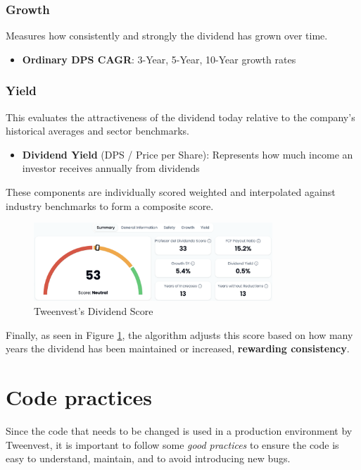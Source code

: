 \documentclass[11pt,english,a4paper,hidelinks]{book}
\begin{document}
\subsubsection{Growth}
\noindent Measures how consistently and strongly the dividend has grown over time.
\begin{itemize}
    \item \textbf{Ordinary DPS CAGR}: 3-Year, 5-Year, 10-Year growth rates
\end{itemize}

\subsubsection{Yield}
\noindent This evaluates the attractiveness of the dividend today relative to the company's historical averages and sector benchmarks.
\begin{itemize}
    \item \textbf{Dividend Yield} (DPS / Price per Share): Represents how much income an investor receives annually from dividends
\end{itemize}

\vspace{0.5cm}
\noindent These components are individually scored weighted and interpolated against industry benchmarks to form a composite score. 

\begin{figure}[H]
    \centering
    \includegraphics[width=0.8\textwidth]{images/tweenvest/dividend score.png}
    \caption{Tweenvest's Dividend Score}
    \label{fig:dividend_score}
\end{figure}

\noindent Finally, as seen in Figure \ref{fig:dividend_score}, the algorithm adjusts this score based on how many years the dividend has been maintained or increased, \textbf{rewarding consistency}.

\section{Code practices}
Since the code that needs to be changed is used in a production environment by Tweenvest, it is important to follow some \textit{good practices} to ensure the code is easy to understand, maintain, and to avoid introducing new bugs.
\end{document}
